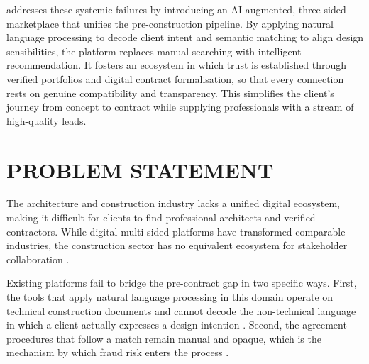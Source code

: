 \fypProjectTitle{} addresses these systemic failures by introducing an
AI-augmented, three-sided marketplace that unifies the pre-construction
pipeline. By applying natural language processing to decode client
intent and semantic matching to align design sensibilities, the platform
replaces manual searching with intelligent recommendation. It fosters an
ecosystem in which trust is established through verified portfolios and
digital contract formalisation, so that every connection rests on
genuine compatibility and transparency. This simplifies the client's
journey from concept to contract while supplying professionals with a
stream of high-quality leads.


\section{PROBLEM STATEMENT}
\label{sec:problem-statement}
%

The architecture and construction industry lacks a unified digital
ecosystem, making it difficult for clients to find professional
architects and verified contractors. While digital multi-sided platforms
have transformed comparable industries, the construction sector has no
equivalent ecosystem for stakeholder collaboration
\cite{hossain2018platform}.

Existing platforms fail to bridge the pre-contract gap in two specific
ways. First, the tools that apply natural language processing in this
domain operate on technical construction documents and cannot decode the
non-technical language in which a client actually expresses a design
intention \cite{lee2017extraction, wu2022nlp}. Second, the agreement
procedures that follow a match remain manual and opaque, which is the
mechanism by which fraud risk enters the process
\cite{li2019blockchain}.

